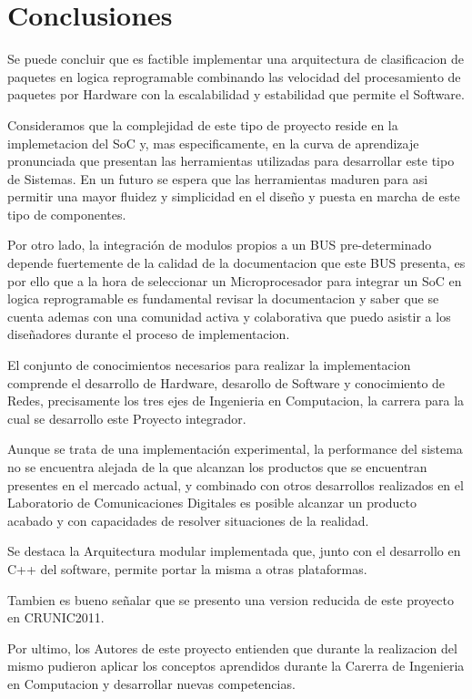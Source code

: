 \chapter{Conclusiones}


Se puede concluir que es factible implementar una arquitectura de clasificacion de paquetes en logica reprogramable combinando las velocidad del procesamiento de paquetes por Hardware con la escalabilidad y estabilidad que permite el Software. 

Consideramos que la complejidad de este tipo de proyecto reside en la implemetacion del SoC y, mas especificamente, en la curva de aprendizaje pronunciada que presentan las herramientas utilizadas para desarrollar este tipo de Sistemas. En un futuro se espera que las herramientas maduren para asi permitir una mayor fluidez y simplicidad en el diseño y puesta en marcha de este tipo de componentes. 

Por otro lado, la integración de modulos propios a un BUS pre-determinado depende fuertemente de la calidad de la documentacion que este BUS presenta, es por ello que a la hora de seleccionar un Microprocesador para integrar un SoC en logica reprogramable es fundamental revisar la documentacion y saber que se cuenta ademas con una comunidad activa y colaborativa que puedo asistir a los diseñadores durante el proceso de implementacion. 

El conjunto de conocimientos necesarios para realizar la implementacion comprende el desarrollo de Hardware, desarollo de Software y conocimiento de Redes, precisamente los tres ejes de Ingenieria en Computacion, la carrera para la cual se desarrollo este Proyecto integrador. 

Aunque se trata de una implementación experimental, la performance del sistema no se encuentra alejada de la que alcanzan los productos que se encuentran presentes en el mercado actual, y combinado con otros desarrollos realizados en el Laboratorio de Comunicaciones Digitales es posible alcanzar un producto acabado y con capacidades de resolver situaciones de la realidad.

Se destaca la Arquitectura modular implementada que, junto con el desarrollo en C++ del software, permite portar la misma a otras plataformas.

Tambien es bueno señalar que se presento una version reducida de este proyecto en CRUNIC2011.

Por ultimo, los Autores de este proyecto entienden que durante la realizacion del mismo pudieron aplicar los conceptos aprendidos durante la Carerra de Ingenieria en Computacion y desarrollar nuevas competencias. 



